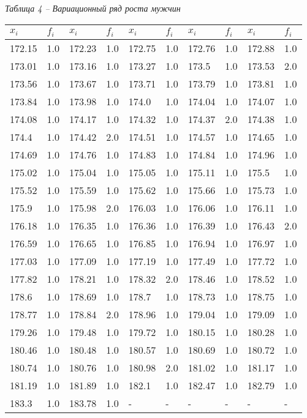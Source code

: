 \noindent\textit{Таблица 4 -- Вариационный ряд роста мужчин}
\begin{longtable}{|p{1.3cm}|p{1.3cm}|p{1.3cm}|p{1.3cm}|p{1.3cm}|p{1.3cm}|p{1.3cm}|p{1.3cm}|p{1.3cm}|p{1.3cm}|}
    \hline
    $x_i$  & $f_i$ & $x_i$  & $f_i$ & $x_i$  & $f_i$ & $x_i$  & $f_i$ & $x_i$  & $f_i$ \\\hline
    172.15 & 1.0   & 172.23 & 1.0   & 172.75 & 1.0   & 172.76 & 1.0   & 172.88 & 1.0   \\\hline
    173.01 & 1.0   & 173.16 & 1.0   & 173.27 & 1.0   & 173.5  & 1.0   & 173.53 & 2.0   \\\hline
    173.56 & 1.0   & 173.67 & 1.0   & 173.71 & 1.0   & 173.79 & 1.0   & 173.81 & 1.0   \\\hline
    173.84 & 1.0   & 173.98 & 1.0   & 174.0  & 1.0   & 174.04 & 1.0   & 174.07 & 1.0   \\\hline
    174.08 & 1.0   & 174.17 & 1.0   & 174.32 & 1.0   & 174.37 & 2.0   & 174.38 & 1.0   \\\hline
    174.4  & 1.0   & 174.42 & 2.0   & 174.51 & 1.0   & 174.57 & 1.0   & 174.65 & 1.0   \\\hline
    174.69 & 1.0   & 174.76 & 1.0   & 174.83 & 1.0   & 174.84 & 1.0   & 174.96 & 1.0   \\\hline
    175.02 & 1.0   & 175.04 & 1.0   & 175.05 & 1.0   & 175.11 & 1.0   & 175.5  & 1.0   \\\hline
    175.52 & 1.0   & 175.59 & 1.0   & 175.62 & 1.0   & 175.66 & 1.0   & 175.73 & 1.0   \\\hline
    175.9  & 1.0   & 175.98 & 2.0   & 176.03 & 1.0   & 176.06 & 1.0   & 176.11 & 1.0   \\\hline
    176.18 & 1.0   & 176.35 & 1.0   & 176.36 & 1.0   & 176.39 & 1.0   & 176.43 & 2.0   \\\hline
    176.59 & 1.0   & 176.65 & 1.0   & 176.85 & 1.0   & 176.94 & 1.0   & 176.97 & 1.0   \\\hline
    177.03 & 1.0   & 177.09 & 1.0   & 177.19 & 1.0   & 177.49 & 1.0   & 177.72 & 1.0   \\\hline
    177.82 & 1.0   & 178.21 & 1.0   & 178.32 & 2.0   & 178.46 & 1.0   & 178.52 & 1.0   \\\hline
    178.6  & 1.0   & 178.69 & 1.0   & 178.7  & 1.0   & 178.73 & 1.0   & 178.75 & 1.0   \\\hline
    178.77 & 1.0   & 178.84 & 2.0   & 178.96 & 1.0   & 179.04 & 1.0   & 179.09 & 1.0   \\\hline
    179.26 & 1.0   & 179.48 & 1.0   & 179.72 & 1.0   & 180.15 & 1.0   & 180.28 & 1.0   \\\hline
    180.46 & 1.0   & 180.48 & 1.0   & 180.57 & 1.0   & 180.69 & 1.0   & 180.72 & 1.0   \\\hline
    180.74 & 1.0   & 180.76 & 1.0   & 180.98 & 2.0   & 181.02 & 1.0   & 181.17 & 1.0   \\\hline
    181.19 & 1.0   & 181.89 & 1.0   & 182.1  & 1.0   & 182.47 & 1.0   & 182.79 & 1.0   \\\hline
    183.3  & 1.0   & 183.78 & 1.0   & -      & -     & -      & -     & -      & -     \\\hline
\end{longtable}

